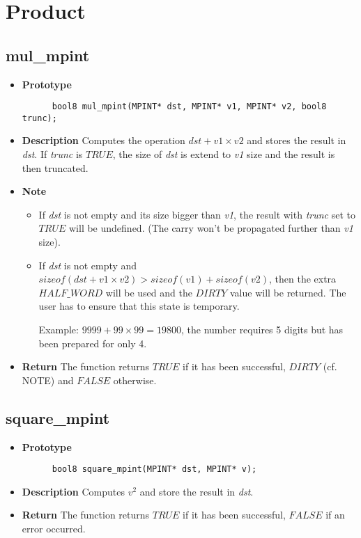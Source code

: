 \documentclass[10pt,a4paper]{article}
\begin{document}
  \section{Product}
  
  \subsection{mul\_mpint}
  
  \begin{itemize}
    \item [] \textbf{Prototype}
    \begin{lstlisting}
      bool8 mul_mpint(MPINT* dst, MPINT* v1, MPINT* v2, bool8 trunc);
    \end{lstlisting}
    \item [] \textbf{Description} Computes the operation $dst + v1 \times v2$ and stores the result in \textit{dst}. If \textit{trunc} is $TRUE$, the size of \textit{dst} is extend to
    \textit{v1} size and the result is then truncated.
    \item [] \textbf{Note} \begin{itemize}
      \item If \textit{dst} is not empty and its size bigger than \textit{v1}, the result with \textit{trunc} set to $TRUE$ will be undefined.
      (The carry won't be propagated further than \textit{v1} size).
      \item If \textit{dst} is not empty and $sizeof(dst + v1 \times v2) > sizeof(v1) + sizeof(v2)$, then the extra $HALF\_WORD$ will be used and the $DIRTY$ value will be returned. The user
      has to ensure that this state is temporary.
      
      Example: $9999 + 99 \times 99 = 19800$, the number requires 5 digits but has been prepared for only 4.
    \end{itemize}
    \item [] \textbf{Return} The function returns $TRUE$ if it has been successful, $DIRTY$ (cf. NOTE) and $FALSE$ otherwise.
  \end{itemize}
  
  \subsection{square\_mpint}
  
  \begin{itemize}
    \item [] \textbf{Prototype}
    \begin{lstlisting}
      bool8 square_mpint(MPINT* dst, MPINT* v);
    \end{lstlisting}
    \item [] \textbf{Description} Computes $v^2$ and store the result in \textit{dst}.
    \item [] \textbf{Return} The function returns $TRUE$ if it has been successful, $FALSE$ if an error occurred.
  \end{itemize}
  
\end{document}
